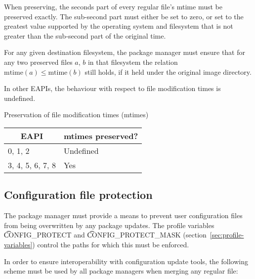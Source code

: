 When preserving, the seconds part of every regular file's mtime must
be preserved exactly. The sub-second part must either be set to zero,
or set to the greatest value supported by the operating system and
filesystem that is not greater than the sub-second part of the
original time.

For any given destination filesystem, the package manager must ensure
that for any two preserved files $a$, $b$ in that filesystem the
relation $\mbox{mtime}(a) \leq \mbox{mtime}(b)$ still holds, if it
held under the original image directory.

In other EAPIs, the behaviour with respect to file modification times
is undefined.

\begin{centertable}{Preservation of file modification times (mtimes)}
    \label{tab:mtime-preserve}
    \begin{tabular}{ll}
      \toprule
      \multicolumn{1}{c}{\textbf{EAPI}} &
      \multicolumn{1}{c}{\textbf{mtimes preserved?}} \\
      \midrule
      0, 1, 2           & Undefined \\
      3, 4, 5, 6, 7, 8  & Yes       \\
      \bottomrule
    \end{tabular}
\end{centertable}

\subsection{Configuration file protection}
\label{sec:config-protect}

The package manager must provide a means to prevent user configuration files from being
overwritten by any package updates. The profile variables \t{CONFIG_PROTECT} and
\t{CONFIG_PROTECT_MASK} (section~\ref{sec:profile-variables}) control the paths for which this
must be enforced.

In order to ensure interoperability with configuration update tools, the following scheme must be
used by all package managers when merging any regular file:

